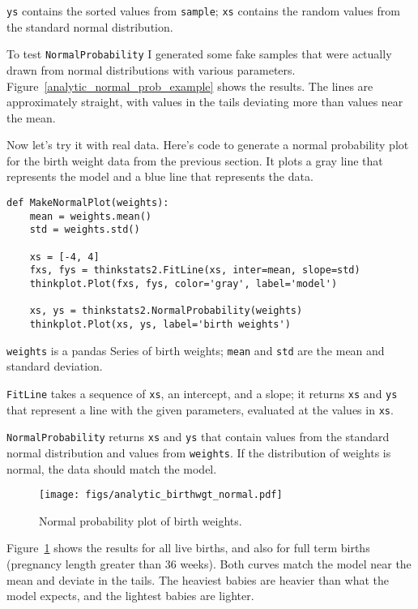 \documentclass[12pt]{book}
\begin{document}
{\tt ys} contains the sorted values from {\tt sample}; {\tt xs}
contains the random values from the standard normal distribution.

To test {\tt NormalProbability} I generated some fake samples that
were actually drawn from normal distributions with various parameters.
Figure~\ref{analytic_normal_prob_example} shows the results.
The lines are approximately straight, with values in the tails
deviating more than values near the mean.

Now let's try it with real data.  Here's code to generate
a normal probability plot for the birth weight data from the
previous section.  It plots a gray line that represents the model
and a blue line that represents the data.

\begin{verbatim}
def MakeNormalPlot(weights):
    mean = weights.mean()
    std = weights.std()

    xs = [-4, 4]
    fxs, fys = thinkstats2.FitLine(xs, inter=mean, slope=std)
    thinkplot.Plot(fxs, fys, color='gray', label='model')

    xs, ys = thinkstats2.NormalProbability(weights)
    thinkplot.Plot(xs, ys, label='birth weights')
\end{verbatim}

{\tt weights} is a pandas Series of birth weights;
{\tt mean} and {\tt std} are the mean and standard deviation.

{\tt FitLine} takes a sequence of {\tt xs}, an intercept, and a
slope; it returns {\tt xs} and {\tt ys} that represent a line
with the given parameters, evaluated at the values in {\tt xs}.

{\tt NormalProbability} returns {\tt xs} and {\tt ys} that
contain values from the standard normal distribution and values
from {\tt weights}.  If the distribution of weights is normal,
the data should match the model.

\begin{figure}
\centerline{\texttt{[image: figs/analytic\_birthwgt\_normal.pdf]}}
\caption{Normal probability plot of birth weights.}
\label{analytic_birthwgt_normal}
\end{figure}

Figure~\ref{analytic_birthwgt_normal} shows the results for
all live births, and also for full term births (pregnancy length greater
than 36 weeks).  Both curves match the model near the mean and
deviate in the tails.  The heaviest babies are heavier than what
the model expects, and the lightest babies are lighter.
\end{document}
